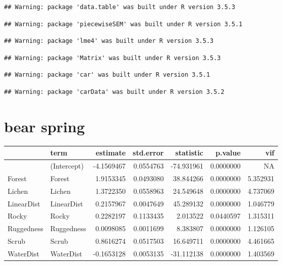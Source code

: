 \documentclass[]{article}
\title{}
\author{}
\date{}
\begin{document}
\clearpage

\begin{verbatim}
## Warning: package 'data.table' was built under R version 3.5.3
\end{verbatim}

\begin{verbatim}
## Warning: package 'piecewiseSEM' was built under R version 3.5.1
\end{verbatim}

\begin{verbatim}
## Warning: package 'lme4' was built under R version 3.5.3
\end{verbatim}

\begin{verbatim}
## Warning: package 'Matrix' was built under R version 3.5.3
\end{verbatim}

\begin{verbatim}
## Warning: package 'car' was built under R version 3.5.1
\end{verbatim}

\begin{verbatim}
## Warning: package 'carData' was built under R version 3.5.2
\end{verbatim}

\section{bear spring}\label{bear-spring}

\begin{tabular}{llrrrrr}
\toprule
  & term & estimate & std.error & statistic & p.value & vif\\
\midrule
 & (Intercept) & -4.1569467 & 0.0554763 & -74.931961 & 0.0000000 & NA\\
Forest & Forest & 1.9153345 & 0.0493080 & 38.844266 & 0.0000000 & 5.352931\\
Lichen & Lichen & 1.3722350 & 0.0558963 & 24.549648 & 0.0000000 & 4.737069\\
LinearDist & LinearDist & 0.2157967 & 0.0047649 & 45.289132 & 0.0000000 & 1.046779\\
Rocky & Rocky & 0.2282197 & 0.1133435 & 2.013522 & 0.0440597 & 1.315311\\
Ruggedness & Ruggedness & 0.0098085 & 0.0011699 & 8.383807 & 0.0000000 & 1.126105\\
Scrub & Scrub & 0.8616274 & 0.0517503 & 16.649711 & 0.0000000 & 4.461665\\
WaterDist & WaterDist & -0.1653128 & 0.0053135 & -31.112138 & 0.0000000 & 1.403569\\
\bottomrule
\end{tabular}
\end{document}
